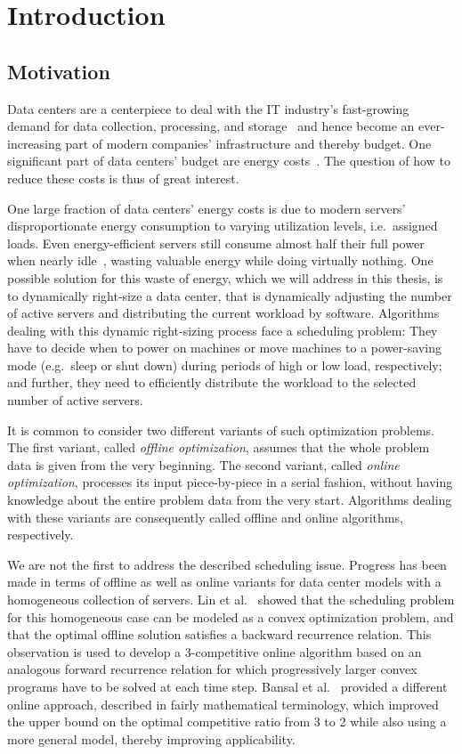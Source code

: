 
\chapter{Introduction}
\section{Motivation}
Data centers are a centerpiece to deal with the IT industry's fast-growing demand for data collection, processing, and storage~\parencite{cisco} and hence become an ever-increasing part of modern companies' infrastructure and thereby budget. One significant part of data centers' budget are energy costs~\parencite{hamilton}. The question of how to reduce these costs is thus of great interest.

One large fraction of data centers' energy costs is due to modern servers' disproportionate energy consumption to varying utilization levels, i.e.\ assigned loads. Even energy-efficient servers still consume almost half their full power when nearly idle~\parencite{barroso}, wasting valuable energy while doing virtually nothing. One possible solution for this waste of energy, which we will address in this thesis, is to dynamically right-size a data center, that is dynamically adjusting the number of active servers and distributing the current workload by software. Algorithms dealing with this dynamic right-sizing process face a scheduling problem: They have to decide when to power on machines or move machines to a power-saving mode (e.g.~sleep or shut down) during periods of high or low load, respectively; and further, they need to efficiently distribute the workload to the selected number of active servers.

It is common to consider two different variants of such optimization problems. The first variant, called \emph{offline optimization}, assumes that the whole problem data is given from the very beginning. The second variant, called \emph{online optimization}, processes its input piece-by-piece in a serial fashion, without having knowledge about the entire problem data from the very start. Algorithms dealing with these variants are consequently called offline and online algorithms, respectively.

We are not the first to address the described scheduling issue. Progress has been made in terms of offline as well as online variants for data center models with a homogeneous collection of servers. Lin et al.~\parencite{dyn-right-sizing} showed that the scheduling problem for this homogeneous case can be modeled as a convex optimization problem, and that the optimal offline solution satisfies a backward recurrence relation. This observation is used to develop a 3-competitive online algorithm based on an analogous forward recurrence relation for which progressively larger convex programs have to be solved at each time step. Bansal et al.~\parencite{bansal-soco} provided a different online approach, described in fairly mathematical terminology, which improved the upper bound on the optimal competitive ratio from 3 to 2 while also using a more general model, thereby improving applicability. 

